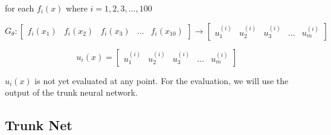 \documentclass[a4paper, onecolumn, 12pt]{article}
\begin{document}
for each $f_i(x)$ where $i=1, 2, 3, \dots, 100$


$$
G_{\theta}:
\begin{bmatrix}
f_i(x_1) & f_i(x_2) & f_i(x_3) & \dots & f_i(x_{10})
\end{bmatrix}
\rightarrow
\begin{bmatrix}
u^{(i)}_1 & u^{(i)}_2 & u^{(i)}_3 & \dots & u^{(i)}_m
\end{bmatrix}
$$


$$
u_i(x) =
\begin{bmatrix}
u^{(i)}_1 & u^{(i)}_2 & u^{(i)}_3 & \dots & u^{(i)}_m
\end{bmatrix}
$$


$u_i(x)$ is not yet evaluated at any point. 
For the evaluation, we will use the output of the trunk neural network.


\subsection*{Trunk Net}

\newpage
\singlespacing


 
\end{document}
